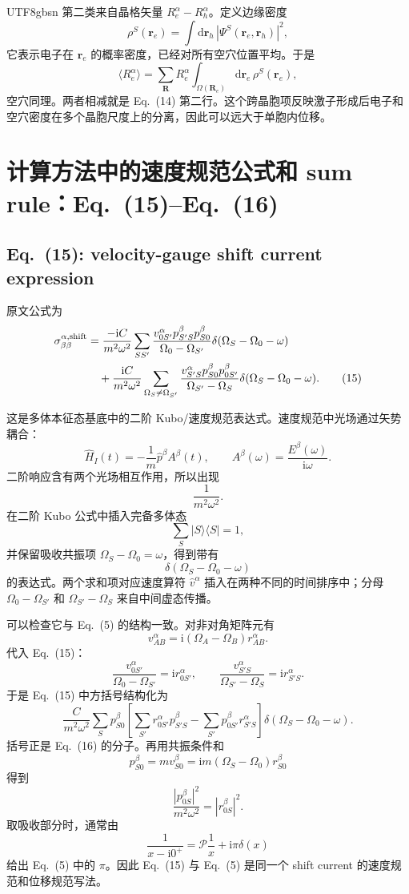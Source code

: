 \documentclass[11pt,a4paper]{article}
\newcommand{\dd}{\mathrm{d}}
\newcommand{\ii}{\mathrm{i}}
\begin{document}
\begin{CJK}{UTF8}{gbsn}
第二类来自晶格矢量 $R^\alpha_e-R^\alpha_h$。定义边缘密度
\[
\rho^S(\bm r_e)=\int \dd\bm r_h\,|\Psi^S(\bm r_e,\bm r_h)|^2,
\]
它表示电子在 $\bm r_e$ 的概率密度，已经对所有空穴位置平均。于是
\[
\langle R^\alpha_e\rangle
=\sum_{\bm R}R^\alpha_e
\int_{\Omega(\bm R_e)}\dd\bm r_e\,\rho^S(\bm r_e),
\]
空穴同理。两者相减就是 Eq.~(14) 第二行。这个跨晶胞项反映激子形成后电子和空穴密度在多个晶胞尺度上的分离，因此可以远大于单胞内位移。

\section{计算方法中的速度规范公式和 sum rule：Eq.~(15)--Eq.~(16)}

\subsection*{Eq.~(15): velocity-gauge shift current expression}

原文公式为
\begin{align}
\sigma^{\alpha,\mathrm{shift}}_{\beta\beta}
&=
\frac{-\ii C}{m^2\omega^2}
\sum_{SS'}
\frac{
v^\alpha_{0S'}p^\beta_{S'S}p^\beta_{S0}
}{
\Omega_0-\Omega_{S'}
}
\delta(\Omega_S-\Omega_0-\omega)
\notag\\
&\quad
+\frac{\ii C}{m^2\omega^2}
\sum_{\Omega_S\ne\Omega_{S'}}
\frac{
v^\alpha_{S'S}p^\beta_{S0}p^\beta_{0S'}
}{
\Omega_{S'}-\Omega_S
}
\delta(\Omega_S-\Omega_0-\omega).
\tag{15}
\end{align}

这是多体本征态基底中的二阶 Kubo/速度规范表达式。速度规范中光场通过矢势耦合：
\[
\hat H_I(t)
=-\frac{1}{m}\hat p^\beta A^\beta(t),
\qquad
A^\beta(\omega)=\frac{E^\beta(\omega)}{\ii\omega}.
\]
二阶响应含有两个光场相互作用，所以出现
\[
\frac{1}{m^2\omega^2}.
\]
在二阶 Kubo 公式中插入完备多体态
\[
\sum_S|S\rangle\langle S|=1,
\]
并保留吸收共振项 $\Omega_S-\Omega_0=\omega$，得到带有
\[
\delta(\Omega_S-\Omega_0-\omega)
\]
的表达式。两个求和项对应速度算符 $\hat v^\alpha$ 插入在两种不同的时间排序中；分母
$\Omega_0-\Omega_{S'}$ 和 $\Omega_{S'}-\Omega_S$ 来自中间虚态传播。

可以检查它与 Eq.~(5) 的结构一致。对非对角矩阵元有
\[
v^\alpha_{AB}
=\ii(\Omega_A-\Omega_B)r^\alpha_{AB}.
\]
代入 Eq.~(15)：
\[
\frac{v^\alpha_{0S'}}{\Omega_0-\Omega_{S'}}
=\ii r^\alpha_{0S'},
\qquad
\frac{v^\alpha_{S'S}}{\Omega_{S'}-\Omega_S}
=\ii r^\alpha_{S'S}.
\]
于是 Eq.~(15) 中方括号结构化为
\[
\frac{C}{m^2\omega^2}
\sum_S p^\beta_{S0}
\left[
\sum_{S'}r^\alpha_{0S'}p^\beta_{S'S}
-\sum_{S'}p^\beta_{0S'}r^\alpha_{S'S}
\right]
\delta(\Omega_S-\Omega_0-\omega).
\]
括号正是 Eq.~(16) 的分子。再用共振条件和
\[
p^\beta_{S0}
=m v^\beta_{S0}
=\ii m(\Omega_S-\Omega_0)r^\beta_{S0}
\]
得到
\[
\frac{|p^\beta_{0S}|^2}{m^2\omega^2}
=|r^\beta_{0S}|^2.
\]
取吸收部分时，通常由
\[
\frac{1}{x-\ii0^+}
=\mathcal P\frac1x+\ii\pi\delta(x)
\]
给出 Eq.~(5) 中的 $\pi$。因此 Eq.~(15) 与 Eq.~(5) 是同一个 shift current 的速度规范和位移规范写法。


\end{CJK}
\end{document}
